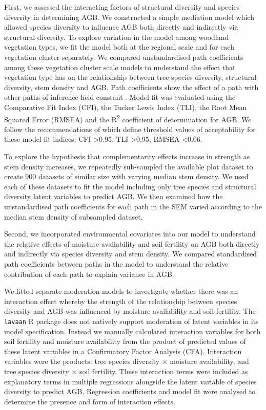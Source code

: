 \documentclass[11pt,a4paper]{article}
\begin{document}
First, we assessed the interacting factors of structural diversity and species diversity in determining AGB. We constructed a simple mediation model which allowed species diversity to influence AGB both directly and indirectly via structural diversity. To explore variation in the model among woodland vegetation types, we fit the model both at the regional scale and for each vegetation cluster separately. We compared unstandardised path coefficients among these vegetation cluster scale models to understand the effect that vegetation type has on the relationship between tree species diversity, structural diversity, stem density and AGB. Path coefficients show the effect of a path with other paths of inference held constant \citep{}. Model fit was evaluated using the Comparative Fit Index (CFI), the Tucker Lewis Index (TLI), the Root Mean Squared Error (RMSEA) and the R\textsuperscript{2} coefficient of determination for AGB. We follow the recommendations of \citet{Hu1999} which define threshold values of acceptability for these model fit indices: CFI >0.95, TLI >0.95, RMSEA <0.06.

To explore the hypothesis that complementarity effects increase in strength as stem density increases, we repeatedly sub-sampled the available plot dataset to create 900 datasets of similar size with varying median stem density. We used each of these datasets to fit the model including only tree species and structural diversity latent variables to predict AGB. We then examined how the unstandardised path coefficients for each path in the SEM varied according to the median stem density of subsampled dataset.

Second, we incorporated environmental covariates into our model to understand the relative effects of moisture availability and soil fertility on AGB both directly and indirectly via species diversity and stem density. We compared standardised path coefficients between paths in the model to understand the relative contribution of each path to explain variance in AGB.

We fitted separate moderation models to investigate whether there was an interaction effect whereby the strength of the relationship between species diversity and AGB was influenced by moisture availability and soil fertility. The \verb|lavaan| R package does not natively support moderation of latent variables in its model specification. Instead we manually calculated interaction variables for both soil fertility and moisture availability from the product of predicted values of these latent variables in a Confirmatory Factor Analysis (CFA). Interaction variables were the products: tree species diversity $\times$ moisture availability, and tree species diversity $\times$ soil fertility. These interaction terms were included as explanatory terms in multiple regressions alongside the latent variable of species diversity to predict AGB. Regression coefficients and model fit were analysed to determine the presence and form of interaction effects.
\end{document}
